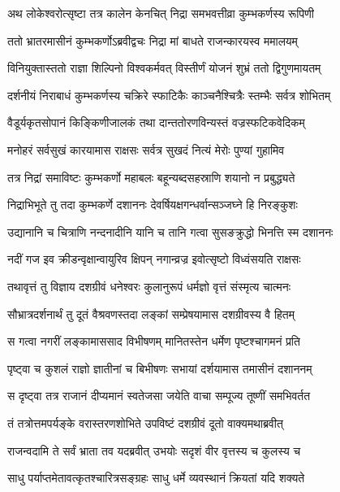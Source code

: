 
\twolineshloka
{अथ लोकेश्वरोत्सृष्टा तत्र कालेन केनचित्}
{निद्रा समभवत्तीव्रा कुम्भकर्णस्य रूपिणी} %

\twolineshloka
{ततो भ्रातरमासीनं कुम्भकर्णोऽब्रवीद्वचः}
{निद्रा मां बाधते राजन्कारयस्व ममालयम्} %

\twolineshloka
{विनियुक्तास्ततो राज्ञा शिल्पिनो विश्वकर्मवत्}
{विस्तीर्णं योजनं शुभ्रं ततो द्विगुणमायतम्} %

\twolineshloka
{दर्शनीयं निराबाधं कुम्भकर्णस्य चक्रिरे}
{स्फाटिकैः काञ्चनैश्चित्रैः स्तम्भैः सर्वत्र शोभितम्} %

\twolineshloka
{वैडूर्यकृतसोपानं किङ्किणीजालकं तथा}
{दान्ततोरणविन्यस्तं वज्रस्फटिकवेदिकम्} %

\twolineshloka
{मनोहरं सर्वसुखं कारयामास राक्षसः}
{सर्वत्र सुखदं नित्यं मेरोः पुण्यां गुहामिव} %

\twolineshloka
{तत्र निद्रां समाविष्टः कुम्भकर्णो महाबलः}
{बहून्यब्दसहस्राणि शयानो न प्रबुद्ध्यते} %

\twolineshloka
{निद्राभिभूते तु तदा कुम्भकर्णे दशाननः}
{देवर्षियक्षगन्धर्वान्सञ्जघ्ने हि निरङ्कुशः} %

\twolineshloka
{उद्यानानि च चित्राणि नन्दनादीनि यानि च}
{तानि गत्वा सुसङक्रुद्धो भिनत्ति स्म दशाननः} %

\twolineshloka
{नदीं गज इव क्रीडन्वृक्षान्वायुरिव क्षिपन्}
{नगान्व्रज्र इवोत्सृष्टो विध्वंसयति राक्षसः} %

\twolineshloka
{तथावृत्तं तु विज्ञाय दशग्रीवं धनेश्वरः}
{कुलानुरूपं धर्मज्ञो वृत्तं संस्मृत्य चात्मनः} %

\twolineshloka
{सौभ्रात्रदर्शनार्थं तु दूतं वैश्रवणस्तदा}
{लङ्कां सम्प्रेषयामास दशग्रीवस्य वै हितम्} %

\twolineshloka
{स गत्वा नगरीं लङ्कामाससाद विभीषणम्}
{मानितस्तेन धर्मेण पृष्टश्चागमनं प्रति} %

\twolineshloka
{पृष्ट्वा च कुशलं राज्ञो ज्ञातीनां च बिभीषणः}
{सभायां दर्शयामास तमासीनं दशाननम्} %

\twolineshloka
{स दृष्ट्वा तत्र राजानं दीप्यमानं स्वतेजसा}
{जयेति वाचा सम्पूज्य तूष्णीं समभिवर्तत} %

\twolineshloka
{तं तत्रोत्तमपर्यङ्के वरास्तरणशोभिते}
{उपविष्टं दशग्रीवं दूतो वाक्यमथाब्रवीत्} %

\twolineshloka
{राजन्वदामि ते सर्वं भ्राता तव यदब्रवीत्}
{उभयोः सदृशं वीर वृत्तस्य च कुलस्य च} %

\twolineshloka
{साधु पर्याप्तमेतावत्कृतश्चारित्रसङ्ग्रहः}
{साधु धर्मे व्यवस्थानं क्रियतां यदि शक्यते} %

